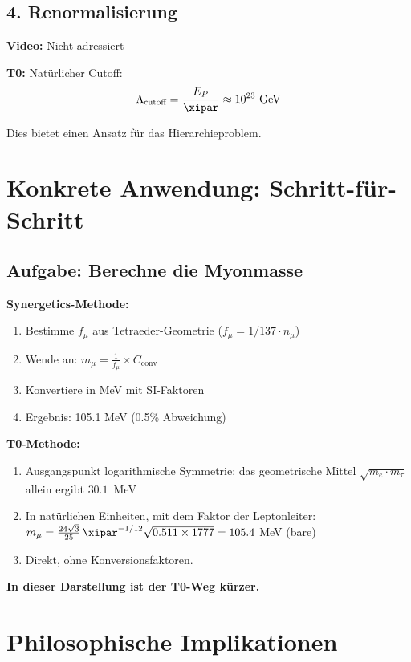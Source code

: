 	\subsection{4. Renormalisierung}
	
	\textbf{Video:} Nicht adressiert
	
	\textbf{T0:} Natürlicher Cutoff:
	\begin{equation}
		\Lambda_{\text{cutoff}} = \frac{E_P}{\xipar} \approx 10^{23} \text{ GeV}
	\end{equation}
	
	Dies bietet einen Ansatz für das Hierarchieproblem.
	
	\section{Konkrete Anwendung: Schritt-für-Schritt}
	
	\subsection{Aufgabe: Berechne die Myonmasse}
	
	\textbf{Synergetics-Methode:}
	\begin{enumerate}
		\item Bestimme $f_\mu$ aus Tetraeder-Geometrie ($f_\mu = 1/137 \cdot n_\mu$)
		\item Wende an: $m_\mu = \frac{1}{f_\mu} \times C_{\text{conv}}$
		\item Konvertiere in MeV mit SI-Faktoren
		\item Ergebnis: 105.1 MeV (0.5\% Abweichung)
	\end{enumerate}
	
	\textbf{T0-Methode:}
	\begin{enumerate}
		\item Ausgangspunkt logarithmische Symmetrie: das geometrische Mittel $\sqrt{m_e \cdot m_\tau}$ allein ergibt $30.1$~MeV
		\item In natürlichen Einheiten, mit dem Faktor der Leptonleiter: $m_\mu = \frac{24\sqrt3}{25}\,\xipar^{-1/12}\sqrt{0.511 \times 1777} = 105.4$ MeV (bare)
		\item Direkt, ohne Konversionsfaktoren.
	\end{enumerate}
	
	\textbf{In dieser Darstellung ist der T0-Weg kürzer.}
	
	\section{Philosophische Implikationen}
	
